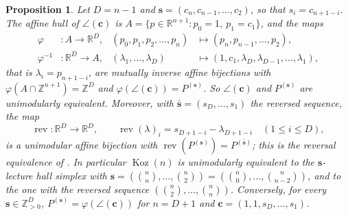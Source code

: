 \documentclass[11pt, a4paper, abstract=yes]{scrartcl}
\theoremstyle{definition}
\theoremstyle{remark}
\theoremstyle{plain}
\newtheorem{proposition}[definition]{Proposition}
\newcommand{\vek}[1]{\boldsymbol{#1}}
\theoremstyle{remark}
\theoremstyle{plain}
\newcommand{\Koz}{\operatorname{Koz}}
\newcommand{\rasimp}{\angle}
\newcommand{\leandiscof}[1]{\tikz[baseline=-0.6ex]\fill[#1] (0,0) circle (0.6ex);}
\newcommand{\leanfull}{\leandiscof{leanfull}}
\newcommand{\leanmark}[1]{\leavevmode{\reversemarginpar\marginnote{\raggedleft#1}}}
\let\autocite\cite
\begin{document}
\begin{proposition}
\leanmark{\leanfull}Let \(D=n-1\) and \(\vek s=(c_n,c_{n-1},\dots,c_2)\), so that \(s_i=c_{n+1-i}\). The affine
hull of \(\rasimp(\vek c)\) is \(A=\lbrace p\in\mathbb R^{n+1}:p_0=1,\ p_1=c_1\rbrace\), and the maps
\begin{equation}\label{eq:lh-maps}
\begin{aligned}
  \varphi&\colon A\to\mathbb R^D, & (p_0,p_1,p_2,\dots,p_n)&\mapsto(p_n,p_{n-1},\dots,p_2),\\
  \varphi^{-1}&\colon\mathbb R^D\to A, & (\lambda_1,\dots,\lambda_D)&\mapsto(1,c_1,\lambda_D,\lambda_{D-1},\dots,\lambda_1),
\end{aligned}
\end{equation}
that is \(\lambda_i=p_{n+1-i}\), are mutually inverse affine bijections with
\(\varphi(A\cap\mathbb Z^{n+1})=\mathbb Z^D\) and \(\varphi(\rasimp(\vek c))=P^{(\vek s)}\). So
\(\rasimp(\vek c)\) and \(P^{(\vek s)}\) are unimodularly equivalent. Moreover, with
\(\bar{\vek s}=(s_D,\dots,s_1)\) the reversed sequence, the map
\begin{equation}\label{eq:lh-reversal}
  \operatorname{rev}\colon\mathbb R^D\to\mathbb R^D,\qquad \operatorname{rev}(\lambda)_i=s_{D+1-i}-\lambda_{D+1-i}\quad(1\le i\le D),
\end{equation}
is a unimodular affine bijection with \(\operatorname{rev}(P^{(\vek s)})=P^{(\bar{\vek s})}\); this is the
reversal equivalence of \autocite{HibiOlsenTsuchiya2018}. In particular \(\Koz(n)\) is unimodularly
equivalent to the \(\vek s\)-lecture hall simplex with
\(\vek s=(\binom nn,\dots,\binom n2)=(\binom n0,\dots,\binom n{n-2})\), and to the one with the
reversed sequence \((\binom n2,\dots,\binom nn)\). Conversely, for every \(\vek s\in\mathbb Z_{>0}^D\),
\(P^{(\vek s)}=\varphi(\rasimp(\vek c))\) for \(n=D+1\) and \(\vek c=(1,1,s_D,\dots,s_1)\).
\label{prop-lecture-hall}
\end{proposition}
\end{document}

